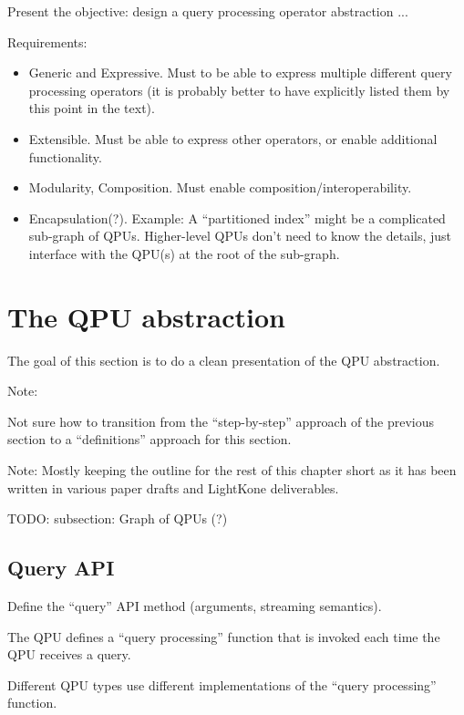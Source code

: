 Present the objective: design a query processing operator abstraction ...

Requirements:
\begin{itemize}
  \item Generic and Expressive. Must to be able to express multiple different
  query processing operators (it is probably better to have explicitly listed
  them by this point in the text).
  \item Extensible. Must be able to express other operators, or enable
  additional functionality.
  \item Modularity, Composition. Must enable composition/interoperability.
  \item Encapsulation(?). Example: A ``partitioned index'' might be a
  complicated sub-graph of QPUs.
  Higher-level QPUs don't need to know the details, just interface with the
  QPU(s) at the root of the sub-graph.
\end{itemize}

\section{The QPU abstraction}
The goal of this section is to do a clean presentation of the QPU abstraction.

\begin{tcolorbox}
Note:

Not sure how to transition from the ``step-by-step'' approach of the
previous section to a ``definitions'' approach for this section.
\end{tcolorbox}

Note: Mostly keeping the outline for the rest of this chapter short as it has
been written in various paper drafts and LightKone deliverables.

TODO: subsection: Graph of QPUs (?)

\subsection{Query API}
Define the ``query'' API method (arguments, streaming semantics).

The QPU defines a ``query processing'' function that is invoked each time the
QPU receives a query.

Different QPU types use different implementations of the ``query processing''
function.

